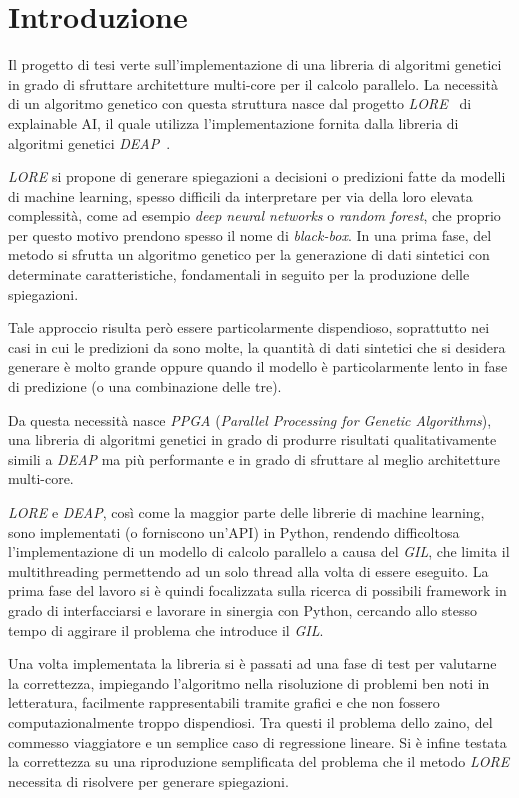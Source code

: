\chapter{Introduzione}\label{cap: introduction}

Il progetto di tesi verte sull'implementazione di una libreria di algoritmi
genetici in grado di sfruttare architetture multi-core per il calcolo parallelo.
La necessità di un algoritmo genetico con questa struttura nasce dal progetto
\textit{LORE}~\cite{guidotti2018LORE} di explainable AI, il quale utilizza
l'implementazione fornita dalla libreria di algoritmi genetici
\textit{DEAP}~\cite{fortin2012DEAP}.

\textit{LORE} si propone di generare spiegazioni a decisioni o predizioni fatte
da modelli di machine learning, spesso difficili da interpretare per via della
loro elevata complessità, come ad esempio \textit{deep neural networks} o
\textit{random forest}, che proprio per questo motivo prendono spesso il nome
di \textit{black-box}. In una prima fase, del metodo si sfrutta un algoritmo
genetico per la generazione di dati sintetici con determinate caratteristiche,
fondamentali in seguito per la produzione delle spiegazioni.

Tale approccio risulta però essere particolarmente dispendioso, soprattutto nei
casi in cui le predizioni da  sono molte, la quantità di dati
sintetici che si desidera generare è molto grande oppure quando il modello è
particolarmente lento in fase di predizione (o una combinazione delle tre).

Da questa necessità nasce \textit{PPGA} (\textit{Parallel Processing for
	Genetic  Algorithms}), una libreria di algoritmi genetici in  grado di
produrre risultati qualitativamente simili a \textit{DEAP} ma più performante e
in grado di sfruttare al meglio architetture multi-core.

\textit{LORE} e \textit{DEAP}, così come la maggior parte delle librerie di
machine learning, sono implementati (o forniscono un'API) in Python, rendendo
difficoltosa l'implementazione di un modello di calcolo parallelo a causa del
\textit{GIL}, che limita il multithreading permettendo ad un solo thread alla
volta di essere eseguito. La prima fase del lavoro si è quindi focalizzata
sulla ricerca di possibili framework in grado di interfacciarsi e lavorare in
sinergia con Python, cercando allo stesso tempo di aggirare il problema che
introduce il \textit{GIL}.

Una volta implementata la libreria si è passati ad una fase di test per
valutarne la correttezza, impiegando l'algoritmo nella risoluzione di problemi
ben noti in letteratura, facilmente rappresentabili tramite grafici e che non
fossero computazionalmente troppo dispendiosi. Tra questi il problema dello
zaino, del commesso viaggiatore e un semplice caso di regressione lineare. Si è
infine testata la correttezza su una riproduzione semplificata del problema che
il metodo \textit{LORE} necessita di risolvere per generare spiegazioni.

